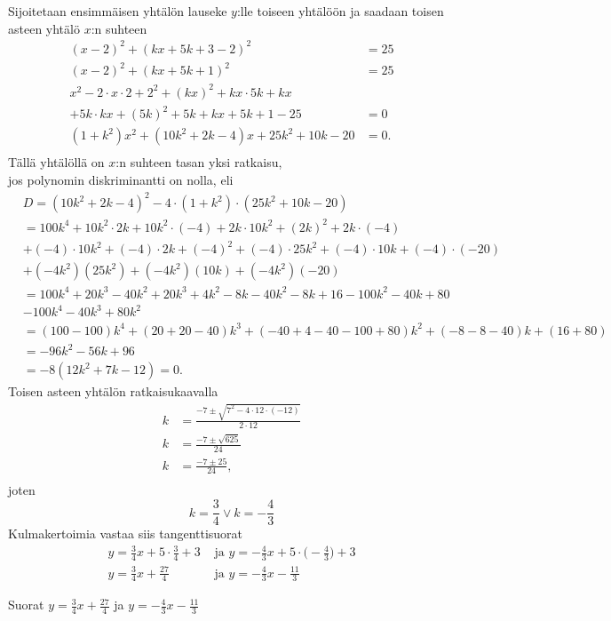 \begin{esimerkki}
\begin{esimratk}
Sijoitetaan ensimmäisen yhtälön lauseke $y$:lle toiseen yhtälöön ja saadaan toisen asteen yhtälö $x$:n suhteen
\begin{align*}
(x-2)^2+(kx+5k+3-2)^2&=25 \\
(x-2)^2+(kx+5k+1)^2&=25 \\
x^2-2\cdot x\cdot 2 +2^2+(kx)^2+kx\cdot 5k+kx&\\
+5k\cdot kx+(5k)^2+5k+kx+5k+1-25& =0 \\
(1+k^2)x^2+(10k^2+2k-4)x+25k^2+10k-20& = 0. \\
\end{align*}
Tällä yhtälöllä on $x$:n suhteen tasan yksi ratkaisu, \\ jos polynomin diskriminantti on nolla, eli
\begin{align*}
& D = (10k^2+2k-4)^2-4\cdot(1+k^2)\cdot(25k^2+10k-20) \\ 
&= 100k^4+10k^2\cdot 2k+10k^2\cdot (-4) +2k\cdot 10k^2+(2k)^2+2k\cdot (-4) \\
& +(-4)\cdot 10k^2+(-4)\cdot 2k+(-4)^2+(-4)\cdot 25k^2+(-4)\cdot 10k+(-4)\cdot (-20) \\
& +(-4k^2)(25k^2)+(-4k^2)(10k)+(-4k^2)(-20) \\
& = 100k^4+20k^3-40k^2+20k^3+4k^2-8k-40k^2-8k+16-100k^2-40k+80 \\
& -100k^4-40k^3+80k^2 \\
& = (100-100)k^4+(20+20-40)k^3+(-40+4-40-100+80)k^2+(-8-8-40)k+(16+80) \\
& = -96k^2-56k+96 \\
&=-8(12k^2+7k-12) = 0.
\end{align*}
Toisen asteen yhtälön ratkaisukaavalla
\begin{align*}
k &= \frac{-7\pm \sqrt{7^2-4\cdot 12\cdot (-12)}}{2\cdot 12} \\
k &= \frac{-7\pm \sqrt{625}}{24} \\
k &= \frac{-7\pm 25 }{24}, \\
\end{align*}
joten
\[
k =  \frac{3}{4} \vee k = -\frac{4}{3}
\]
Kulmakertoimia vastaa siis tangenttisuorat
\begin{align*}
y = \frac{3}{4}x+5\cdot \frac{3}{4}+3 &\textrm{  ja  } y = -\frac{4}{3}x+5\cdot \Big(-\frac{4}{3}\Big)+3 \\
y = \frac{3}{4}x+\frac{27}{4} &\textrm{  ja  } y = -\frac{4}{3}x-\frac{11}{3}
\end{align*}

\begin{esimvast}
Suorat $y = \frac{3}{4}x+\frac{27}{4}$ ja $y = -\frac{4}{3}x-\frac{11}{3}$
\end{esimvast}
\end{esimratk}
\end{esimerkki}


